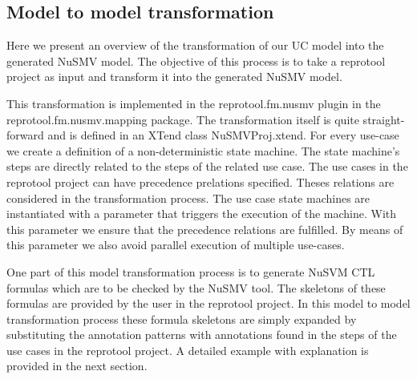 \subsection{Model to model transformation}

Here we present an overview of the transformation of our UC model into the generated NuSMV model. The objective of this process is to
take a reprotool project as input and transform it into the generated NuSMV model.

This transformation is implemented in the reprotool.fm.nusmv plugin in the reprotool.fm.nusmv.mapping package.
The transformation itself is quite straight-forward and is defined in an XTend class NuSMVProj.xtend.
For every use-case we create a definition of a non-deterministic state machine.
The state machine's steps are directly related to the steps of the related use case.
The use cases in the reprotool project can have precedence prelations specified. Theses relations are considered in the
transformation process. The use case state machines are instantiated with a parameter that triggers the execution of the machine.
With this parameter we ensure that the precedence relations are fulfilled. By means of this parameter we also avoid parallel execution
of multiple use-cases.

One part of this model transformation process is to generate NuSVM CTL formulas which are to be checked by the NuSMV tool. The
skeletons of these formulas are provided by the user in the reprotool project. In this model to model transformation process these
formula skeletons are simply expanded by substituting the annotation patterns with annotations found in the steps of the use cases
in the reprotool project. A detailed example with explanation is provided in the next section.